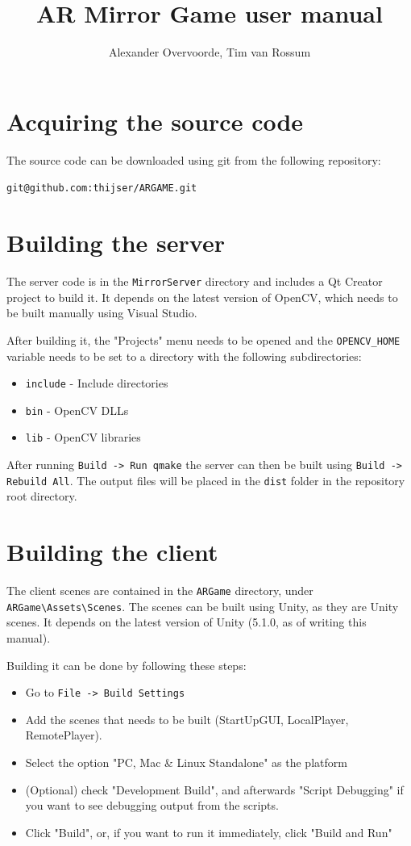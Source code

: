 \documentclass[]{report}
\title{AR Mirror Game user manual}
\author{Alexander Overvoorde, Tim van Rossum}
\begin{document}
\maketitle

\section*{Acquiring the source code}

The source code can be downloaded using git from the following repository:

\verb#git@github.com:thijser/ARGAME.git#

\section*{Building the server}

The server code is in the \verb#MirrorServer# directory and includes a Qt
Creator project to build it. It depends on the latest version of OpenCV, which
needs to be built manually using Visual Studio.

After building it, the "Projects" menu needs to be opened and the
\verb#OPENCV_HOME# variable needs to be set to a directory with the following
subdirectories:

\begin{itemize}
    \item \verb#include# - Include directories
    \item \verb#bin# - OpenCV DLLs
    \item \verb#lib# - OpenCV libraries
\end{itemize}

After running \verb#Build -> Run qmake# the server can then be built using
\verb#Build -> Rebuild All#. The output files will be placed in the \verb#dist#
folder in the repository root directory.

\section*{Building the client}

The client scenes are contained in the \verb#ARGame# directory, under 
\verb#ARGame\Assets\Scenes#. The scenes can be built using Unity, as they are 
Unity scenes. It depends on the latest version of Unity (5.1.0, as of writing 
this manual). 

Building it can be done by following these steps:

\begin{itemize}
	\item Go to \verb#File -> Build Settings#
	\item Add the scenes that needs to be built (StartUpGUI, LocalPlayer, RemotePlayer).
	\item Select the option "PC, Mac \& Linux Standalone" as the platform
	\item (Optional) check "Development Build", and afterwards "Script Debugging" if you want to see debugging output from the scripts.
	\item Click "Build", or, if you want to run it immediately, click "Build and Run"
\end{itemize}
\end{document}
